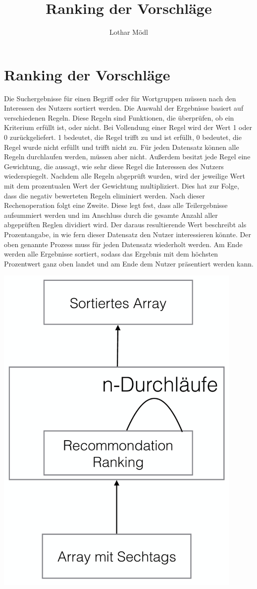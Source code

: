 
\title{Ranking der Vorschläge}
\author{Lothar Mödl}

\section{Ranking der Vorschläge}

Die Suchergebnisse für einen Begriff oder  für Wortgruppen müssen nach den Interessen des Nutzers sortiert werden. Die Auswahl der Ergebnisse basiert auf verschiedenen Regeln. Diese Regeln sind Funktionen, die überprüfen, ob ein Kriterium erfüllt ist, oder nicht. Bei Vollendung einer Regel wird der Wert 1 oder 0 zurückgeliefert. 1 bedeutet, die Regel trifft zu und ist erfüllt, 0 bedeutet, die Regel wurde nicht erfüllt und trifft nicht zu. Für jeden Datensatz können alle Regeln durchlaufen werden, müssen aber nicht. Außerdem besitzt jede Regel eine Gewichtung, die aussagt, wie sehr diese Regel die Interessen des Nutzers wiederspiegelt. Nachdem alle Regeln abgeprüft wurden, wird der jeweilige Wert mit dem prozentualen Wert der Gewichtung multipliziert. Dies hat zur Folge, dass die negativ bewerteten Regeln eliminiert werden. Nach dieser Rechenoperation folgt eine Zweite. Diese legt fest, dass alle Teilergebnisse aufsummiert werden und im Anschluss durch die gesamte Anzahl aller abgeprüften Reglen dividiert wird. Der daraus resultierende Wert beschreibt als Prozentangabe, in wie fern dieser Datensatz den Nutzer interessieren könnte. Der oben genannte Prozess muss für jeden Datensatz wiederholt werden. Am Ende werden alle Ergebnisse sortiert, sodass das Ergebnis mit dem höchsten Prozentwert ganz oben landet und am Ende dem Nutzer präsentiert werden kann. 

\includegraphics[width=12cm]{Pics/rankinguebersicht}

